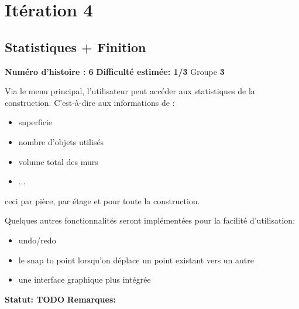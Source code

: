 \documentclass[a4paper]{article} \usepackage{framed} \usepackage{fullpage} \usepackage[french]{babel} \usepackage[utf8]{inputenc} \usepackage[T1]{fontenc}
\begin{document}
\section{Itération 4}
\begin{framed}
\subsection{Statistiques + Finition}

\textbf{Numéro d'histoire : 6}  
\textbf{Difficulté estimée: 1/3}  Groupe \textbf{3}

Via le menu principal, l’utilisateur peut accéder aux statistiques de la construction. C’est-à-dire aux informations de :
\begin{itemize}
\item superficie
\item nombre d’objets utilisés
\item volume total des murs
\item ...
\end{itemize}
ceci par pièce, par étage et pour toute la construction.

Quelques autres fonctionnalités seront implémentées pour la facilité d'utilisation:
\begin{itemize}
\item undo/redo
\item le snap to point lorsqu'on déplace un point existant vers un autre
\item une interface graphique plus intégrée
\end{itemize}

\textbf{Statut: TODO}  \textbf{Remarques:}
\end{framed}
\end{document}

